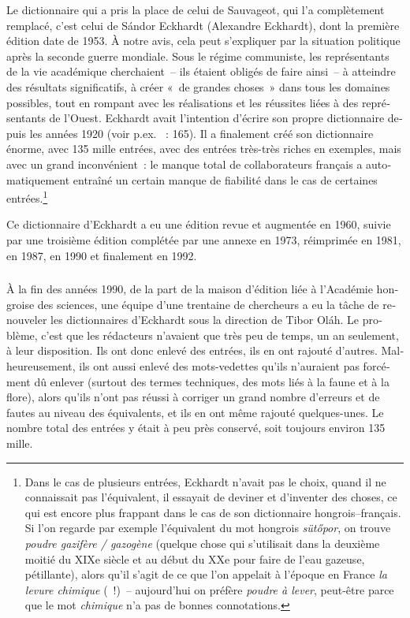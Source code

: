 \documentclass[output=paper,colorlinks,citecolor=brown,arabicfont,chinesefont,booklanguage=french]{langscibook}
\begin{document}
\begin{otherlanguage}{french}
Le dictionnaire qui a pris la place de celui de Sauvageot, qui l’a complètement remplacé, c’est celui de Sándor Eckhardt (Alexandre Eckhardt), dont la première édition date de 1953. À notre avis, cela peut s’expliquer par la situation politique après la seconde guerre mondiale. Sous le régime communiste, les représentants de la vie académique cherchaient~-- ils étaient obligés de faire ainsi~-- à atteindre des résultats significatifs, à créer «~de grandes choses~» dans tous les domaines possibles, tout en rompant avec les réalisations et les réussites liées à des représentants de l’Ouest. Eckhardt avait l’intention d’écrire son propre dictionnaire depuis les années 1920 (voir p.ex. \citealt{Sauvageot1932} ~: 165). Il a finalement créé son dictionnaire énorme, avec 135 mille entrées, avec des entrées très-très riches en exemples, mais avec un grand inconvénient~: le manque total de collaborateurs français a automatiquement entraîné un certain manque de fiabilité dans le cas de certaines entrées.\footnote{Dans le cas de plusieurs entrées, Eckhardt n’avait pas le choix, quand il ne connaissait pas l’équivalent, il essayait de deviner et d’inventer des choses, ce qui est encore plus frappant dans le cas de son dictionnaire hongrois–français. Si l’on regarde par exemple l’équivalent du mot hongrois \emph{sütőpor}, on trouve \emph{poudre gazifère / gazogène} (quelque chose qui s’utilisait dans la deuxième moitié du XIXe siècle et au début du XXe pour faire de l’eau gazeuse, pétillante), alors qu’il s’agit de ce que l’on appelait à l’époque en France \emph{la levure chimique} (~!)~-- aujourd’hui on préfère \emph{poudre à lever}, peut-être parce que le mot \emph{chimique} n’a pas de bonnes connotations.}

Ce dictionnaire d’Eckhardt a eu une édition revue et augmentée en 1960, suivie par une troisième édition complétée par une annexe en 1973, réimprimée en 1981, en 1987, en 1990 et finalement en 1992.

\subsubsection{\citealt{EckhardtOlah1999} }\label{sec:tillinger:2.1.7}

À la fin des années 1990, de la part de la maison d’édition liée à l’Académie hongroise des sciences, une équipe d’une trentaine de chercheurs a eu la tâche de renouveler les dictionnaires d’Eckhardt sous la direction de Tibor Oláh. Le problème, c’est que les rédacteurs n’avaient que très peu de temps, un an seulement, à leur disposition. Ils ont donc enlevé des entrées, ils en ont rajouté d’autres. Malheureusement, ils ont aussi enlevé des mots-vedettes qu’ils n’auraient pas forcément dû enlever (surtout des termes techniques, des mots liés à la faune et à la flore), alors qu’ils n’ont pas réussi à corriger un grand nombre d’erreurs et de fautes au niveau des équivalents, et ils en ont même rajouté quelques-unes. Le nombre total des entrées y était à peu près conservé, soit toujours environ 135 mille. 


\end{otherlanguage}
\end{document}
